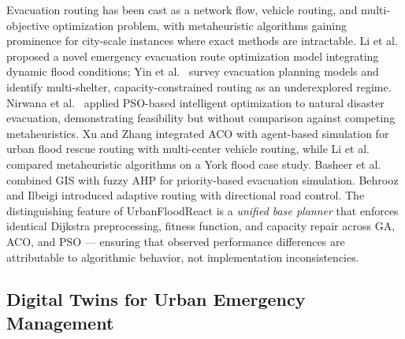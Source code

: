 \documentclass[journal]{IEEEtran}
\begin{document}
Evacuation routing has been cast as a network flow, vehicle routing, and multi-objective
optimization problem, with metaheuristic algorithms gaining prominence for city-scale
instances where exact methods are intractable. Li et al.\ \cite{li2024evacuation} proposed
a novel emergency evacuation route optimization model integrating dynamic flood conditions;
Yin et al.\ \cite{yin2025overview} survey evacuation planning models and identify
multi-shelter, capacity-constrained routing as an underexplored regime. Nirwana et al.\
\cite{nirwana2024intelligent} applied PSO-based intelligent optimization to natural disaster
evacuation, demonstrating feasibility but without comparison against competing metaheuristics.
Xu and Zhang \cite{xu2024aco} integrated ACO with agent-based simulation for urban flood
rescue routing with multi-center vehicle routing, while Li et al.\ \cite{li2025metaheuristic}
compared metaheuristic algorithms on a York flood case study. Basheer et al.\
\cite{basheer2023priority} combined GIS with fuzzy AHP for priority-based evacuation
simulation. Behrooz and Ilbeigi \cite{behrooz2024adaptive} introduced adaptive routing with
directional road control. The distinguishing feature of UrbanFloodReact is a \textit{unified
base planner} that enforces identical Dijkstra preprocessing, fitness function, and capacity
repair across GA, ACO, and PSO — ensuring that observed performance differences are
attributable to algorithmic behavior, not implementation inconsistencies.

\subsection{Digital Twins for Urban Emergency Management}
\end{document}

